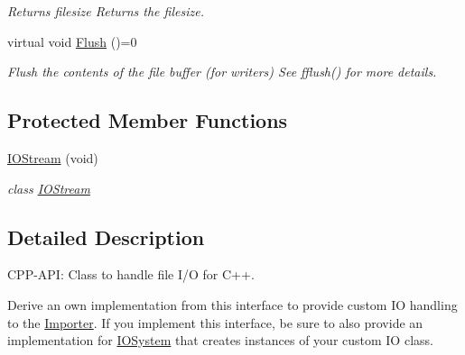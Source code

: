 \begin{DoxyCompactItemize}
\begin{DoxyCompactList}\small\item\em Returns filesize Returns the filesize. \end{DoxyCompactList}\item 
\hypertarget{class_assimp_1_1_i_o_stream_a7c19952446ece90924b246f087417899}{virtual void \hyperlink{class_assimp_1_1_i_o_stream_a7c19952446ece90924b246f087417899}{Flush} ()=0}\label{class_assimp_1_1_i_o_stream_a7c19952446ece90924b246f087417899}

\begin{DoxyCompactList}\small\item\em Flush the contents of the file buffer (for writers) See fflush() for more details. \end{DoxyCompactList}\end{DoxyCompactItemize}
\subsection*{Protected Member Functions}
\begin{DoxyCompactItemize}
\item 
\hyperlink{class_assimp_1_1_i_o_stream_af5ae78123b6c6f7afc31b2a52dc9192e}{I\-O\-Stream} (void)
\begin{DoxyCompactList}\small\item\em class \hyperlink{class_assimp_1_1_i_o_stream}{I\-O\-Stream} \end{DoxyCompactList}\end{DoxyCompactItemize}


\subsection{Detailed Description}
C\-P\-P-\/\-A\-P\-I\-: Class to handle file I/\-O for C++. 

Derive an own implementation from this interface to provide custom I\-O handling to the \hyperlink{class_assimp_1_1_importer}{Importer}. If you implement this interface, be sure to also provide an implementation for \hyperlink{class_assimp_1_1_i_o_system}{I\-O\-System} that creates instances of your custom I\-O class. 

